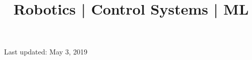 \documentclass[10pt,a4paper]{moderncv}
\title{Robotics | Control Systems  | ML 
	\newline
	\bf{\lb{\footnotesize
			Rerum Cognoscere Causas: To know the causes of things.} }}
\begin{document}
	\makecvtitle
	
	
	
	
	
	
	
	
	
	
	
%
	\footnotesize \centering Last updated: May 3, 2019
\clearpage
\end{document}

